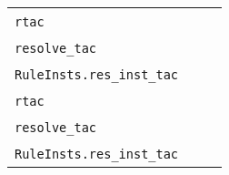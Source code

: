 \begin{isabellebody}
\begin{isamarkuptext}
  \medskip
  \begin{tabular}{lll}
    \verb|rtac|~\isa{{\isachardoublequote}a\ {\isadigit{1}}{\isachardoublequote}} & & \isa{{\isachardoublequote}rule\ a{\isachardoublequote}} \\
    \verb|resolve_tac|~\isa{{\isachardoublequote}{\isacharbrackleft}a\isactrlsub {\isadigit{1}}{\isacharcomma}\ {\isasymdots}{\isacharbrackright}\ {\isadigit{1}}{\isachardoublequote}} & & \isa{{\isachardoublequote}rule\ a\isactrlsub {\isadigit{1}}\ {\isasymdots}{\isachardoublequote}} \\
    \verb|RuleInsts.res_inst_tac|~\isa{{\isachardoublequote}ctxt\ {\isacharbrackleft}{\isacharparenleft}x\isactrlsub {\isadigit{1}}{\isacharcomma}\ t\isactrlsub {\isadigit{1}}{\isacharparenright}{\isacharcomma}\ {\isasymdots}{\isacharbrackright}\ a\ {\isadigit{1}}{\isachardoublequote}} & &
    \isa{{\isachardoublequote}rule{\isacharunderscore}tac\ x\isactrlsub {\isadigit{1}}\ {\isacharequal}\ t\isactrlsub {\isadigit{1}}\ {\isasymAND}\ {\isasymdots}\ {\isasymIN}\ a{\isachardoublequote}} \\[0.5ex]
    \verb|rtac|~\isa{{\isachardoublequote}a\ i{\isachardoublequote}} & & \isa{{\isachardoublequote}rule{\isacharunderscore}tac\ {\isacharbrackleft}i{\isacharbrackright}\ a{\isachardoublequote}} \\
    \verb|resolve_tac|~\isa{{\isachardoublequote}{\isacharbrackleft}a\isactrlsub {\isadigit{1}}{\isacharcomma}\ {\isasymdots}{\isacharbrackright}\ i{\isachardoublequote}} & & \isa{{\isachardoublequote}rule{\isacharunderscore}tac\ {\isacharbrackleft}i{\isacharbrackright}\ a\isactrlsub {\isadigit{1}}\ {\isasymdots}{\isachardoublequote}} \\
    \verb|RuleInsts.res_inst_tac|~\isa{{\isachardoublequote}ctxt\ {\isacharbrackleft}{\isacharparenleft}x\isactrlsub {\isadigit{1}}{\isacharcomma}\ t\isactrlsub {\isadigit{1}}{\isacharparenright}{\isacharcomma}\ {\isasymdots}{\isacharbrackright}\ a\ i{\isachardoublequote}} & &
    \isa{{\isachardoublequote}rule{\isacharunderscore}tac\ {\isacharbrackleft}i{\isacharbrackright}\ x\isactrlsub {\isadigit{1}}\ {\isacharequal}\ t\isactrlsub {\isadigit{1}}\ {\isasymAND}\ {\isasymdots}\ {\isasymIN}\ a{\isachardoublequote}} \\
  \end{tabular}
  \medskip


\end{isamarkuptext}
\end{isabellebody}
